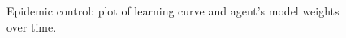 \documentclass[letterpaper]{article} %
\theoremstyle{definition}
\begin{document}
\begin{figure}[t]
    \centering
    \caption{Epidemic control: plot of learning curve and agent's model weights over time.}
    \label{fig:JP_EC}
\end{figure}
\end{document}
